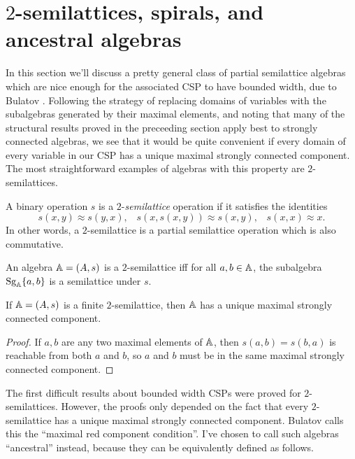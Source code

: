 \documentclass[letterpaper,11pt]{article}
\DeclareMathOperator{\Sg}{Sg}
\begin{document}
\section{$2$-semilattices, spirals, and ancestral algebras}

In this section we'll discuss a pretty general class of partial semilattice algebras which are nice enough for the associated CSP to have bounded width, due to Bulatov \cite{colored-graph-prelim}. Following the strategy of replacing domains of variables with the subalgebras generated by their maximal elements, and noting that many of the structural results proved in the preceeding section apply best to strongly connected algebras, we see that it would be quite convenient if every domain of every variable in our CSP has a unique maximal strongly connected component. The most straightforward examples of algebras with this property are $2$-semilattices.

\begin{defn} A binary operation $s$ is a $2$-\emph{semilattice} operation if it satisfies the identities
\[
s(x,y) \approx s(y,x), \;\;\; s(x,s(x,y)) \approx s(x,y), \;\;\; s(x,x) \approx x.
\]
In other words, a $2$-semilattice is a partial semilattice operation which is also commutative.
\end{defn}

\begin{prop} An algebra $\mathbb{A} = (A,s)$ is a $2$-semilattice iff for all $a,b \in \mathbb{A}$, the subalgebra $\Sg_{\bA}\{a,b\}$ is a semilattice under $s$.
\end{prop}

\begin{prop} If $\mathbb{A} = (A,s)$ is a finite $2$-semilattice, then $\mathbb{A}$ has a unique maximal strongly connected component.
\end{prop}
\begin{proof} If $a, b$ are any two maximal elements of $\mathbb{A}$, then $s(a,b) = s(b,a)$ is reachable from both $a$ and $b$, so $a$ and $b$ must be in the same maximal strongly connected component.
\end{proof}

The first difficult results about bounded width CSPs were proved for $2$-semilattices. However, the proofs only depended on the fact that every $2$-semilattice has a unique maximal strongly connected component. Bulatov \cite{colored-graph-prelim} calls this the ``maximal red component condition''. I've chosen to call such algebras ``ancestral'' instead, because they can be equivalently defined as follows.
\end{document}
